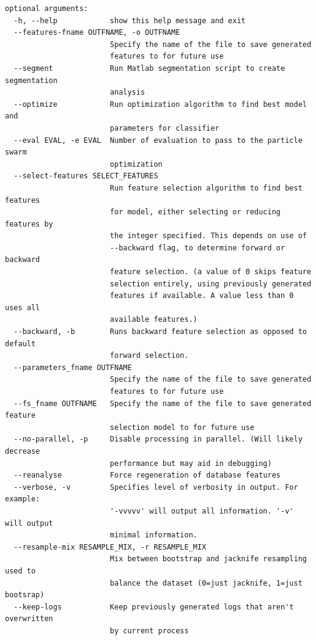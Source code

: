 \documentclass[titlepage, 12pt]{scrartcl} \usepackage{enumitem}
\begin{document}
\begin{lstlisting}[numbers=none]
optional arguments:
  -h, --help            show this help message and exit
  --features-fname OUTFNAME, -o OUTFNAME
                        Specify the name of the file to save generated
                        features to for future use
  --segment             Run Matlab segmentation script to create segmentation
                        analysis
  --optimize            Run optimization algorithm to find best model and
                        parameters for classifier
  --eval EVAL, -e EVAL  Number of evaluation to pass to the particle swarm
                        optimization
  --select-features SELECT_FEATURES
                        Run feature selection algorithm to find best features
                        for model, either selecting or reducing features by
                        the integer specified. This depends on use of
                        --backward flag, to determine forward or backward
                        feature selection. (a value of 0 skips feature
                        selection entirely, using previously generated
                        features if available. A value less than 0 uses all
                        available features.)
  --backward, -b        Runs backward feature selection as opposed to default
                        forward selection.
  --parameters_fname OUTFNAME
                        Specify the name of the file to save generated
                        features to for future use
  --fs_fname OUTFNAME   Specify the name of the file to save generated feature
                        selection model to for future use
  --no-parallel, -p     Disable processing in parallel. (Will likely decrease
                        performance but may aid in debugging)
  --reanalyse           Force regeneration of database features
  --verbose, -v         Specifies level of verbosity in output. For example:
                        '-vvvvv' will output all information. '-v' will output
                        minimal information.
  --resample-mix RESAMPLE_MIX, -r RESAMPLE_MIX
                        Mix between bootstrap and jacknife resampling used to
                        balance the dataset (0=just jacknife, 1=just bootsrap)
  --keep-logs           Keep previously generated logs that aren't overwritten
                        by current process
\end{lstlisting}
\doublespacing


\pagebreak{}
\printbibliography{}
\end{document}
